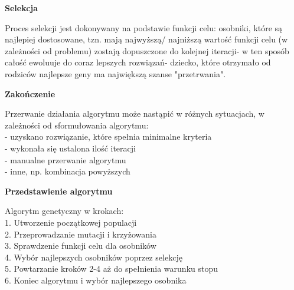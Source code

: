 \documentclass[a4paper, twoside, 12pt, justified]{article}
\begin{document}
	\begin{center}
		\textbf{Selekcja}
	\end{center}    
	
	Proces selekcji jest dokonywany na podstawie funkcji celu: osobniki, które są najlepiej dostosowane, tzn. mają najwyższą/ najniższą wartość funkcji celu (w zależności od problemu) zostają dopuszczone do kolejnej iteracji- w ten sposób całość ewoluuje do coraz lepszych rozwiązań- dziecko, które otrzymało od rodziców najlepsze geny ma największą szanse "przetrwania".
	
	
	\begin{center}
		\textbf{Zakończenie}
	\end{center} 	

	Przerwanie działania algorytmu może nastąpić w różnych sytuacjach, w zależności od sformułowania algorytmu:\\
	- uzyskano rozwiązanie, które spełnia minimalne kryteria\\
	- wykonała się ustalona ilość iteracji\\
	- manualne przerwanie algorytmu\\
	- inne, np. kombinacja powyższych\\

 	\begin{large}
 		\begin{center}
 			\textbf{Przedstawienie algorytmu}
 		\end{center}
 	\end{large}
 
	
	Algorytm genetyczny w krokach:\\
	1. Utworzenie początkowej populacji\\
	2. Przeprowadzanie mutacji i krzyżowania\\
	3. Sprawdzenie funkcji celu dla osobników\\
	4. Wybór najlepszych osobników poprzez selekcję\\
	5. Powtarzanie kroków 2-4 aż do spełnienia warunku stopu\\
	6. Koniec algorytmu i wybór najlepszego osobnika
	
\end{document}

